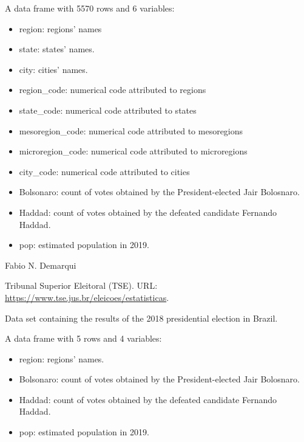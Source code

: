 \documentclass[letterpaper]{book}
\begin{document}
\begin{Format}
A data frame with 5570 rows and 6 variables:
\begin{itemize}

\item{} region: regions' names
\item{} state: states' names.
\item{} city: cities' names.
\item{} region\_code: numerical code attributed to regions
\item{} state\_code: numerical code attributed to states
\item{} mesoregion\_code: numerical code attributed to mesoregions
\item{} microregion\_code: numerical code attributed to microregions
\item{} city\_code: numerical code attributed to cities
\item{} Bolsonaro: count of votes obtained by the President-elected Jair Bolosnaro.
\item{} Haddad: count of votes obtained by the defeated candidate Fernando Haddad.
\item{} pop: estimated population in 2019.

\end{itemize}

\end{Format}
%
\begin{Author}\relax
Fabio N. Demarqui 
\end{Author}
%
\begin{Source}\relax
Tribunal Superior Eleitoral (TSE). URL:  \url{https://www.tse.jus.br/eleicoes/estatisticas}.
\end{Source}
%
\begin{Description}\relax
Data set containing the results of the 2018 presidential election in Brazil.
\end{Description}
%
\begin{Format}
A data frame with 5 rows and 4 variables:
\begin{itemize}

\item{} region: regions' names.
\item{} Bolsonaro: count of votes obtained by the President-elected Jair Bolosnaro.
\item{} Haddad: count of votes obtained by the defeated candidate Fernando Haddad.
\item{} pop: estimated population in 2019.

\end{itemize}

\end{Format}
\end{document}
